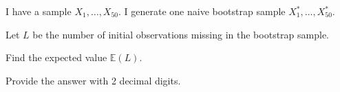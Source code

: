 
\begin{question}
I have a sample \(X_1, \ldots, X_{50}\).
I generate one naive bootstrap sample \(X^*_1, \ldots, X^*_{50}\).

Let \(L\) be the number of initial observations missing in the bootstrap sample.

Find the expected value \(\mathbb{E}(L)\).

Provide the answer with 2 decimal digits.
\end{question}


